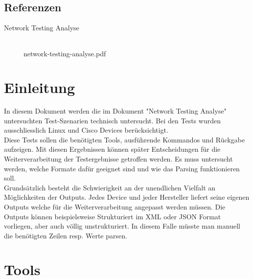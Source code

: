 \documentclass[a4,12pt]{scrartcl}
\begin{document}
\subsection{Referenzen}
\begin{description}
  \item[Network Testing Analyse] \hfill \\
  network-testing-analyse.pdf \\
\end{description}
\newpage
\section{Einleitung}
In diesem Dokument werden die im Dokument "Network Testing Analyse" untersuchten Test-Szenarien technisch untersucht. Bei den Tests wurden ausschliesslich Linux und Cisco Devices berücksichtigt.\\

\noindent Diese Tests sollen die benötigten Tools, ausführende Kommandos und Rückgabe aufzeigen. Mit diesen Ergebnissen können später Entscheidungen für die Weiterverarbeitung der Testergebnisse getroffen werden. Es muss untersucht werden, welche Formate dafür geeignet sind und wie das Parsing funktionieren soll.\\

\noindent Grundsätzlich besteht die Schwierigkeit an der unendlichen Vielfalt an Möglichkeiten der Outputs. Jedes Device und jeder Hersteller liefert seine eigenen Outputs welche für die Weiterverarbeitung angepasst werden müssen. Die Outputs können beispielsweise Strukturiert im XML oder JSON Format vorliegen, aber auch völlig unstrukturiert. In diesem Falle müsste man manuell die benötigten Zeilen resp. Werte parsen.

\newpage
\section{Tools}
\end{document}
